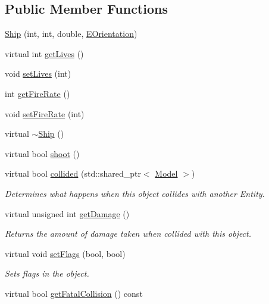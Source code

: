 \subsection*{\-Public \-Member \-Functions}
\begin{DoxyCompactItemize}
\item 
\hyperlink{classmodels_1_1Ship_a5138678b499d6d15c4b7ebef7e6d01d5}{\-Ship} (int, int, double, \hyperlink{namespacemodels_adec64ede5178a8b8fed882b3790d423d}{\-E\-Orientation})
\item 
virtual int \hyperlink{classmodels_1_1Ship_af26c5ca97e37197f48ea983a668035f6}{get\-Lives} ()
\item 
void \hyperlink{classmodels_1_1Ship_a79a5082391e2107638d45a51ce9770c2}{set\-Lives} (int)
\item 
int \hyperlink{classmodels_1_1Ship_a72f0be3703de59176bf176a7a06fcd39}{get\-Fire\-Rate} ()
\item 
void \hyperlink{classmodels_1_1Ship_aa06aba3051126d29e6e942eec54b350d}{set\-Fire\-Rate} (int)
\item 
virtual \hyperlink{classmodels_1_1Ship_aa193577f5d3e0ff3ca6e3223090d3e71}{$\sim$\-Ship} ()
\item 
virtual bool \hyperlink{classmodels_1_1Ship_afc4a82da0df7e98ba74ca068946358f5}{shoot} ()
\item 
virtual bool \hyperlink{classmodels_1_1Ship_aaa5808c580620f89bb0a04d3583a112e}{collided} (std\-::shared\-\_\-ptr$<$ \hyperlink{classmodels_1_1Model}{\-Model} $>$)
\begin{DoxyCompactList}\small\item\em \-Determines what happens when this object collides with another \-Entity. \end{DoxyCompactList}\item 
virtual unsigned int \hyperlink{classmodels_1_1Ship_acf8c86d8f95c22f990c37628ed40491e}{get\-Damage} ()
\begin{DoxyCompactList}\small\item\em \-Returns the amount of damage taken when collided with this object. \end{DoxyCompactList}\item 
virtual void \hyperlink{classmodels_1_1Ship_a75c0e291076162e3efb9679c5896d515}{set\-Flags} (bool, bool)
\begin{DoxyCompactList}\small\item\em \-Sets flags in the object. \end{DoxyCompactList}\item 
virtual bool \hyperlink{classmodels_1_1Ship_af67b94824ab048b3623497ccbaa7fd3c}{get\-Fatal\-Collision} () const 
\end{DoxyCompactItemize}
